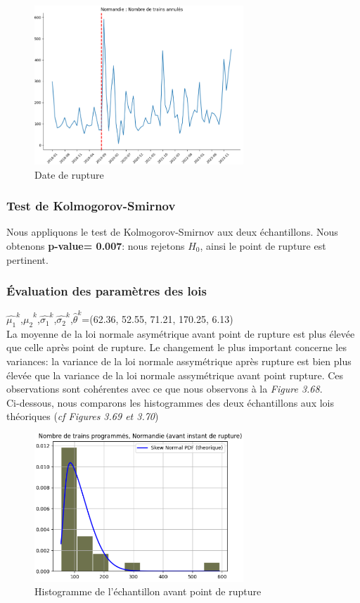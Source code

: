{\begin{figure}[H]
  \centering
  \includegraphics[width=0.7\textwidth]{Nor_TA_3.png}
  \caption{Date de rupture}
\end{figure}

\subsubsection{Test de Kolmogorov-Smirnov}

Nous appliquons le test de Kolmogorov-Smirnov aux deux échantillons. Nous obtenons \textbf{p-value= 0.007}: nous rejetons $H_0$, ainsi le point de rupture est pertinent.
\subsubsection{Évaluation des paramètres des lois}

$\hat{\mu_1}^k$,$\hat{\mu_2}^k$,$\hat{\sigma_1}^k$,$\hat{\sigma_2}^k$,$\hat{\theta}^k$=(62.36,  52.55, 71.21, 170.25, 6.13)\\

La moyenne de la loi normale asymétrique avant point de rupture est plus élevée que celle après point de rupture. Le changement le plus important concerne les variances: la variance de la loi normale assymétrique après rupture est bien plus élevée que la variance de la loi normale assymétrique avant point rupture. Ces observations sont cohérentes avec ce que nous observons à la \textit{Figure 3.68}.\\

Ci-dessous, nous comparons les histogrammes des deux échantillons aux lois théoriques (\textit{cf Figures 3.69 et 3.70})

\begin{figure}[H]
  \centering
  \includegraphics[width=0.7\textwidth]{Nor_TA_4.png}
  \caption{Histogramme de l'échantillon avant point de rupture}
\end{figure}

}
